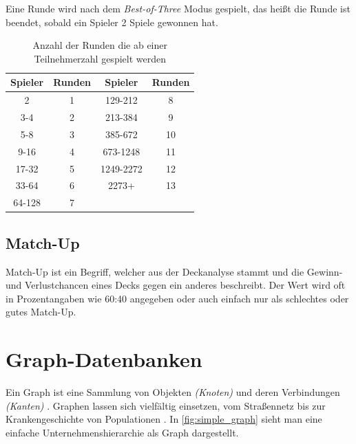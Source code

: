 Eine Runde wird nach dem \emph{Best-of-Three} Modus gespielt, das heißt die Runde ist beendet, sobald ein Spieler 2 Spiele gewonnen hat. 

\begin{table}[t]
    
    \caption{Anzahl der Runden die ab einer Teilnehmerzahl gespielt werden \cite{wotc:swiss}} 
    
    \myfloatalign
    \begin{tabular}{cc|cc}
        \toprule 
        Spieler & Runden & Spieler & Runden \\ 
        \midrule 
        2      & 1 & 129-212   & 8  \\ 
        3-4    & 2 & 213-384   & 9  \\ 
        5-8    & 3 & 385-672   & 10 \\ 
        9-16   & 4 & 673-1248  & 11 \\ 
        17-32  & 5 & 1249-2272 & 12 \\ 
        33-64  & 6 & 2273+     & 13 \\ 
        64-128 & 7 &           &  \\ 
        \bottomrule 
    \end{tabular}
    \label{tab:swisspairings}
\end{table}

\subsection{Match-Up}
Match-Up ist ein Begriff, welcher aus der Deckanalyse stammt und die Gewinn- und Verlustchancen eines Decks gegen ein anderes beschreibt. Der Wert wird oft in Prozentangaben wie 60:40 angegeben oder auch einfach nur als schlechtes oder gutes Match-Up.

\section{Graph-Datenbanken}
Ein Graph ist eine Sammlung von Objekten \emph{(Knoten)} und deren Verbindungen \emph{(Kanten)} \cite{robinsongraph:2015}. Graphen lassen sich vielfältig einsetzen, vom Straßennetz bis zur Krankengeschichte von Populationen \cite{robinsongraph:2015}. In \autoref{fig:simple_graph} sieht man eine einfache Unternehmenshierarchie als Graph dargestellt. 

